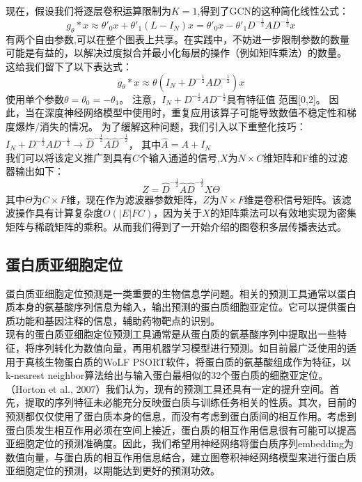 \documentclass[a4paper,UTF8]{article}
\begin{document}
现在，假设我们将逐层卷积运算限制为$K = 1$,得到了GCN的这种简化线性公式：
$$g_\theta \ast x \approx \theta'_0x + \theta'_1(L-I_N)x=\theta'_0x-\theta'_1{D}^{-\frac{1}{2}} {A} {D}^{-\frac{1}{2}} x$$
有两个自由参数,可以在整个图表上共享。在实践中，不妨进一步限制参数的数量可能是有益的，以解决过度拟合并最小化每层的操作（例如矩阵乘法）的数量。 这给我们留下了以下表达式：
$$g_\theta \ast x \approx \theta \left(I_N+{D}^{-\frac{1}{2}} {A} {D}^{-\frac{1}{2}} \right)x$$
使用单个参数$\theta=\theta_0=-\theta_1$。 注意，$I_N+{D}^{-\frac{1}{2}} {A} {D}^{-\frac{1}{2}}$具有特征值
范围[0,2]。 因此，当在深度神经网络模型中使用时，重复应用该算子可能导致数值不稳定性和梯度爆炸/消失的情况。 为了缓解这种问题，我们引入以下重整化技巧：$I_N+{D}^{-\frac{1}{2}} {A} {D}^{-\frac{1}{2}} \rightarrow \hat{D}^{-\frac{1}{2}} \hat{A} \hat{D}^{-\frac{1}{2}}$， 其中$\hat{A}= A + I_N$\\

我们可以将该定义推广到具有$C$个输入通道的信号,$X$为$N×C$维矩阵和F维的过滤器输出如下：
$$Z = \hat{D}^{-\frac{1}{2}} \hat{A} \hat{D}^{-\frac{1}{2}} X \Theta $$
其中$\Theta $为$C×F$维，现在作为滤波器参数矩阵，$Z$为$N×F$维是卷积信号矩阵。该滤波操作具有计算复杂度$O(\vert E \vert FC)$，因为关于$X$的矩阵乘法可以有效地实现为密集矩阵与稀疏矩阵的乘积。从而我们得到了一开始介绍的图卷积多层传播表达式。

\subsection{蛋白质亚细胞定位}

蛋白质亚细胞定位预测是一类重要的生物信息学问题。相关的预测工具通常以蛋白质本身的氨基酸序列信息为输入，输出预测的蛋白质细胞亚定位。它可以提供蛋白质功能和基因注释的信息，辅助药物靶点的识别。\\

现有的蛋白质亚细胞定位预测工具通常是从蛋白质的氨基酸序列中提取出一些特征，将序列转化为数值向量，再用机器学习模型进行预测。如目前最广泛使用的适用于真核生物蛋白质的WoLF PSORT软件，将蛋白质的氨基酸组成作为特征，以k-nearest neighbor算法给出与输入蛋白最相似的32个蛋白质的细胞亚定位。（Horton et al., 2007）我们认为，现有的预测工具还具有一定的提升空间。首先，提取的序列特征未必能充分反映蛋白质与训练任务相关的性质。其次，目前的预测都仅仅使用了蛋白质本身的信息，而没有考虑到蛋白质间的相互作用。考虑到蛋白质发生相互作用必须在空间上接近，蛋白质的相互作用信息很有可能可以提高亚细胞定位的预测准确度。因此，我们希望用神经网络将蛋白质序列embedding为数值向量，与蛋白质的相互作用信息结合，建立图卷积神经网络模型来进行蛋白质亚细胞定位的预测，以期能达到更好的预测功效。\\
\end{document}
